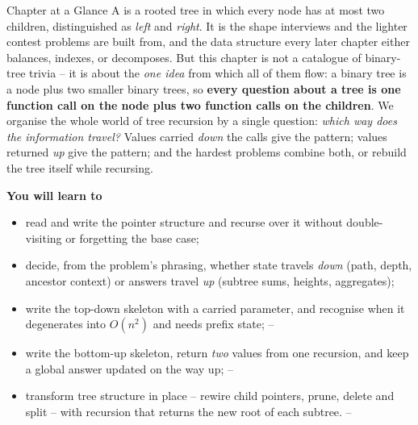 
\begin{chaptertheorybox}{Chapter at a Glance}
A  is a rooted tree in which every node has at most two children,
distinguished as \emph{left} and \emph{right}. It is the shape interviews and the
lighter contest problems are built from, and the data structure every later chapter
either balances, indexes, or decomposes. But this chapter is not a catalogue of
binary-tree trivia -- it is about the \emph{one idea} from which all of them flow: a
binary tree is a node plus two smaller binary trees, so
\textbf{every question about a tree is one function call on the node plus two
function calls on the children}. We organise the whole world of tree recursion by a
single question: \emph{which way does the information travel?} Values carried
\emph{down} the calls give the  pattern; values returned \emph{up}
give the  pattern; and the hardest problems combine both, or rebuild
the tree itself while recursing.

\textbf{You will learn to}
\begin{itemize}[nosep]
  \item read and write the  pointer structure and recurse over it
        without double-visiting or forgetting the \nil{} base case;      \hfill{}
  \item decide, from the problem's phrasing, whether state travels \emph{down}
        (path, depth, ancestor context) or answers travel \emph{up}
        (subtree sums, heights, aggregates);                            \hfill{}
  \item write the top-down skeleton with a carried parameter, and recognise when it
        degenerates into $O(n^2)$ and needs prefix state;               \hfill{}--
  \item write the bottom-up skeleton, return \emph{two} values from one recursion, and
        keep a global answer updated on the way up;                     \hfill{}--
  \item transform tree structure in place -- rewire child pointers, prune, delete and
        split -- with recursion that returns the new root of each subtree. \hfill{}--
\end{itemize}


\end{chaptertheorybox}
